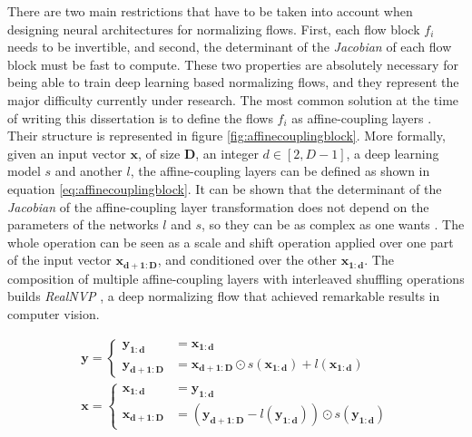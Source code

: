 There are two main restrictions that have to be taken into account when designing neural architectures for normalizing flows. First, each flow block $f_i$ needs to be invertible, and second, the determinant of the \textit{Jacobian} of each flow block must be fast to compute. These two properties are absolutely necessary for being able to train deep learning based normalizing flows, and they represent the major difficulty currently under research. The most common solution at the time of writing this dissertation is to define the flows $f_i$ as affine-coupling layers \autocite{dinh2018}. Their structure is represented in figure \ref{fig:affinecouplingblock}. More formally, given an input vector $\mathbf{x}$, of size $\mathbf{D}$, an integer $d \in [2,D-1]$, a deep learning model $s$ and another $l$, the affine-coupling layers can be defined as shown in equation \ref{eq:affinecouplingblock}. It can be shown that the determinant of the \textit{Jacobian} of the affine-coupling layer transformation does not depend on the parameters of the networks $l$ and $s$, so they can be as complex as one wants \autocite{dinh2018}. The whole operation can be seen as a scale and shift operation applied over one part of the input vector $\mathbf{x_{d+1:D}}$, and conditioned over the other $\mathbf{x_{1:d}}$. The composition of multiple affine-coupling layers with interleaved shuffling operations builds \textit{RealNVP} \autocite{dinh2018}, a deep normalizing flow that achieved remarkable results in computer vision.

\begin{equation}
\label{eq:affinecouplingblock}
\begin{gathered}
	 \mathbf{y} = \begin{cases} \mathbf{y_{1: d}} & = \mathbf{x_{1: d}} \\
	\mathbf{y_{d+1: D}} & =\mathbf{x_{d+1: D}} \odot s\left(\mathbf{x_{1: d}}\right)+l\left(\mathbf{x_{1: d}}\right)\end{cases} \\
	\mathbf{x} = \begin{cases}
	\mathbf{x_{1: d}} &=\mathbf{y_{1: d}} \\
	\mathbf{x_{d+1: D}} &=\left(\mathbf{y_{d+1: D}}-l\left(\mathbf{y_{1: d}}\right)\right) \odot s\left(\mathbf{y_{1: d}}\right)
	\end{cases}
\end{gathered}
\end{equation}

